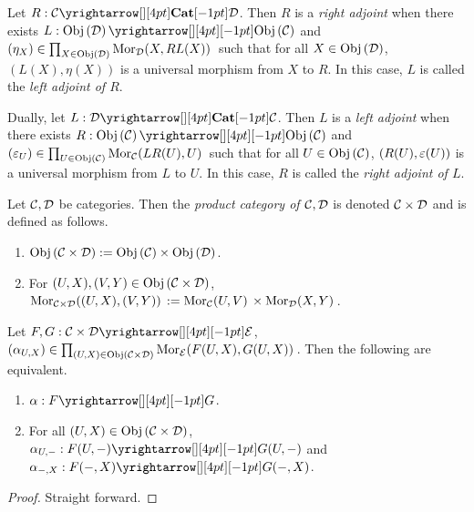 \begin{dfn}
  
  Let $R : \map{\CC}{\DD}{\CAT}{}$.
  Then $R$ is a \emph{right adjoint} when 
  there exists $L : \map{\obj{\DD}}{\obj{\CC}}{}{}$ and 
  $(\eta_X) \in \prod_{X \in \mathrm{Obj}\left(\mathcal{D}\right)} \mathrm{Mor}_{\mathcal{D}}(X, RL(X))\,$ such that 
  for all $X\in\mathrm{Obj}\left(\mathcal{D}\right)$, 
  $(L(X),\eta(X))$ is a universal morphism from $X$ to $R$.
  In this case, $L$ is called the \emph{left adjoint of $R$}.
  \newline 
  
  Dually, let $L : \map{\DD}{\CC}{\CAT}{}$.
  Then $L$ is a \emph{left adjoint} when 
  there exists $R : \map{\obj{\CC}}{\obj{\CC}}{}{}$ and 
  $(\varepsilon_U) \in \prod_{U \in \mathrm{Obj}\left(\mathcal{C}\right)} \mathrm{Mor}_{\mathcal{C}}(LR(U), U)\,$ such that 
  for all $U\in\mathrm{Obj}\left(\mathcal{C}\right)$,
  $(R(U),\varepsilon(U))$ is a universal morphism from $L$ to $U$. 
  In this case, $R$ is called the \emph{right adjoint of $L$}.
\end{dfn}

\begin{dfn}
  
  Let $\mathcal{C}, \mathcal{D}$ be categories. 
  Then the \emph{product category of $\mathcal{C}, \mathcal{D}$} is denoted 
  $\mathcal{C}\times\mathcal{D}$ and is defined as follows. 
  \begin{enumerate}
    \item $\mathrm{Obj}\left(\mathcal{C}\times\mathcal{D}\right) := \mathrm{Obj}\left(\mathcal{C}\right)\times\mathrm{Obj}\left(\mathcal{D}\right)$.
    \item For $(U,X), (V,Y) \in \mathrm{Obj}\left(\mathcal{C}\times\mathcal{D}\right)$, 
    $\mathrm{Mor}_{\mathcal{C}\times\mathcal{D}}((U,X), (V,Y))\, := \mathrm{Mor}_{\mathcal{C}}(U, V)\,\times\mathrm{Mor}_{\mathcal{D}}(X, Y)\,$.
  \end{enumerate}
\end{dfn}

\begin{prop}
  
  Let $F, G : \map{\CC\times\DD}{\EE}{}{}$, 
  $(\alpha_{U,X}) \in \prod_{(U,X) \in \mathrm{Obj}\left(\mathcal{C}\times\mathcal{D}\right)} 
    \mathrm{Mor}_{\mathcal{E}}(F(U,X), G(U,X))\,$.
  Then the following are equivalent. 
  \begin{enumerate}
    \item $\al : \map{F}{G}{}{}$.
    \item For all $(U,X) \in \mathrm{Obj}\left(\mathcal{C}\times\mathcal{D}\right)$, 
    $\al_{U,-} : \map{F(U,-)}{G(U,-)}{}{}$ and 
    $\al_{-,X} : \map{F(-,X)}{G(-,X)}{}{}$.
  \end{enumerate}
\end{prop}
\begin{proof}
  Straight forward.
\end{proof}

